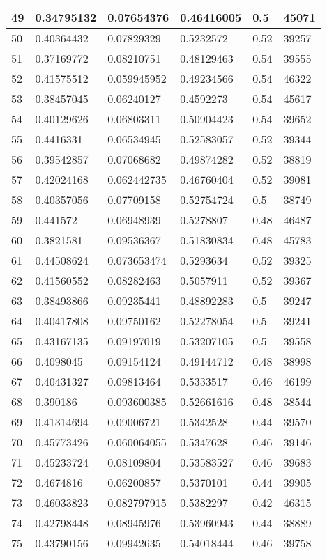 \begin{longtable}{|l|l|l|l|l|l|}
49 & 0.34795132 & 0.07654376 & 0.46416005 & 0.5 & 45071 \\ \hline 
50 & 0.40364432 & 0.07829329 & 0.5232572 & 0.52 & 39257 \\ \hline 
51 & 0.37169772 & 0.08210751 & 0.48129463 & 0.54 & 39555 \\ \hline 
52 & 0.41575512 & 0.059945952 & 0.49234566 & 0.54 & 46322 \\ \hline 
53 & 0.38457045 & 0.06240127 & 0.4592273 & 0.54 & 45617 \\ \hline 
54 & 0.40129626 & 0.06803311 & 0.50904423 & 0.54 & 39652 \\ \hline 
55 & 0.4416331 & 0.06534945 & 0.52583057 & 0.52 & 39344 \\ \hline 
56 & 0.39542857 & 0.07068682 & 0.49874282 & 0.52 & 38819 \\ \hline 
57 & 0.42024168 & 0.062442735 & 0.46760404 & 0.52 & 39081 \\ \hline 
58 & 0.40357056 & 0.07709158 & 0.52754724 & 0.5 & 38749 \\ \hline 
59 & 0.441572 & 0.06948939 & 0.5278807 & 0.48 & 46487 \\ \hline 
60 & 0.3821581 & 0.09536367 & 0.51830834 & 0.48 & 45783 \\ \hline 
61 & 0.44508624 & 0.073653474 & 0.5293634 & 0.52 & 39325 \\ \hline 
62 & 0.41560552 & 0.08282463 & 0.5057911 & 0.52 & 39367 \\ \hline 
63 & 0.38493866 & 0.09235441 & 0.48892283 & 0.5 & 39247 \\ \hline 
64 & 0.40417808 & 0.09750162 & 0.52278054 & 0.5 & 39241 \\ \hline 
65 & 0.43167135 & 0.09197019 & 0.53207105 & 0.5 & 39558 \\ \hline 
66 & 0.4098045 & 0.09154124 & 0.49144712 & 0.48 & 38998 \\ \hline 
67 & 0.40431327 & 0.09813464 & 0.5333517 & 0.46 & 46199 \\ \hline 
68 & 0.390186 & 0.093600385 & 0.52661616 & 0.48 & 38544 \\ \hline 
69 & 0.41314694 & 0.09006721 & 0.5342528 & 0.44 & 39570 \\ \hline 
70 & 0.45773426 & 0.060064055 & 0.5347628 & 0.46 & 39146 \\ \hline 
71 & 0.45233724 & 0.08109804 & 0.53583527 & 0.46 & 39683 \\ \hline 
72 & 0.4674816 & 0.06200857 & 0.5370101 & 0.44 & 39905 \\ \hline 
73 & 0.46033823 & 0.082797915 & 0.5382297 & 0.42 & 46315 \\ \hline 
74 & 0.42798448 & 0.08945976 & 0.53960943 & 0.44 & 38889 \\ \hline 
75 & 0.43790156 & 0.09942635 & 0.54018444 & 0.46 & 39758 \\ \hline 
\end{longtable}